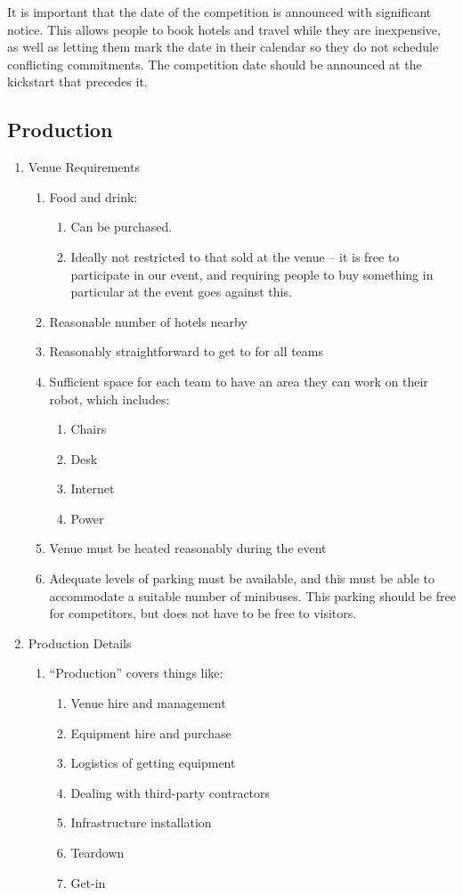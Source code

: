 It is important that the date of the competition is announced with significant notice.  This allows people to book hotels and travel while they are inexpensive, as well as letting them mark the date in their calendar so they do not schedule conflicting commitments.  The competition date should be announced at the kickstart that precedes it.

\subsection{Production}
\begin{enumerate}
\item Venue Requirements
    \begin{enumerate}
    \item Food and drink:
      \begin{enumerate}
      \item Can be purchased.
      \item Ideally not restricted to that sold at the venue -- it is free to participate in our event, and requiring people to buy something in particular at the event goes against this.
      \end{enumerate}
    \item Reasonable number of hotels nearby
    \item Reasonably straightforward to get to for all teams
    \item Sufficient space for each team to have an area they can work on their robot, which includes:
      \begin{enumerate}
      \item Chairs
      \item Desk
      \item Internet
      \item Power
      \end{enumerate}
    \item Venue must be heated reasonably during the event
    \item Adequate levels of parking must be available, and this must be able to accommodate a suitable number of minibuses.  This parking should be free for competitors, but does not have to be free to visitors. 
    \end{enumerate}

\item Production Details
  \begin{enumerate}
  \item ``Production'' covers things like:
    \begin{enumerate}
    \item Venue hire and management
    \item Equipment hire and purchase
    \item Logistics of getting equipment
    \item Dealing with third-party contractors
    \item Infrastructure installation
    \item Teardown
    \item Get-in
    \end{enumerate}


\end{enumerate}
\end{enumerate}
